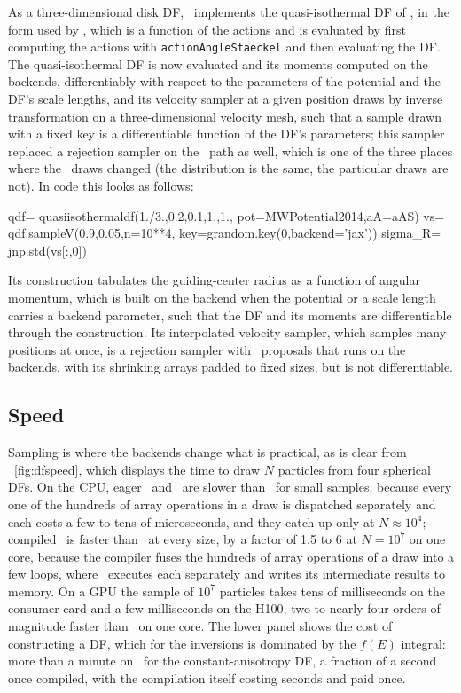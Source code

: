 As a three-dimensional disk DF, \galpy\ implements the quasi-isothermal
DF of \citet{Binney2010,BinneyMcMillan2011}, in the form used by
\citet{BovyRix2013},
which is a function of the actions and is evaluated by first computing the actions with 
\texttt{actionAngleStaeckel} and then evaluating the DF.  The quasi-isothermal DF is now 
evaluated and its moments computed on the backends,
differentiably with respect to the parameters of the potential and the
DF's scale lengths, and its velocity sampler at a given position draws
by inverse transformation on a three-dimensional velocity mesh, such
that a sample drawn with a fixed key is a differentiable function of the
DF's parameters;
this sampler replaced a rejection sampler on the \numpy\ path as well,
which is one of the three places where the \numpy\ draws changed (the
distribution is the same, the particular draws are not). In code this looks as follows:
\begin{code}
qdf= quasiisothermaldf(1./3.,0.2,0.1,1.,1.,
                       pot=MWPotential2014,aA=aAS)
vs= qdf.sampleV(0.9,0.05,n=10**4,
                key=grandom.key(0,backend='jax'))
sigma_R= jnp.std(vs[:,0])
\end{code}
Its construction tabulates the guiding-center radius as a function of
angular momentum, which is built on the backend when the potential or a
scale length carries a backend parameter, such that the DF and its
moments are differentiable through the construction. Its interpolated
velocity sampler, which samples many positions at once, is a rejection
sampler with \numpy\ proposals that runs on the backends, with its
shrinking arrays padded to fixed sizes, but is not differentiable.

\subsection{Speed}\label{sec:df-speed}

Sampling is where the backends change what is practical, as is clear
from \figurename~\ref{fig:dfspeed}, which displays the time to draw $N$
particles from four spherical DFs. On the CPU, eager \jax\ and \torch\ are slower
than \numpy\ for small samples, because every one of the hundreds of
array operations in a draw is dispatched separately and each costs a few
to tens of microseconds, and they catch up only at $N\approx10^4$;
compiled \jax\ is faster than \numpy\ at every size, by a factor of
1.5 to 6 at $N=10^7$ on one core, because the compiler fuses the
hundreds of array operations of a draw into a few loops, where \numpy\
executes each separately and writes its intermediate results to
memory. On a GPU the sample of $10^7$ particles takes
tens of milliseconds on the consumer card and a few milliseconds on the
H100, two to nearly four orders of magnitude faster than \numpy\ on
one core. The lower panel
shows the cost of constructing a DF, which for the inversions is
dominated by the $f(E)$ integral: more than a minute on \numpy\ for the
constant-anisotropy DF, a fraction of a second once compiled, with the
compilation itself costing seconds and paid once.


